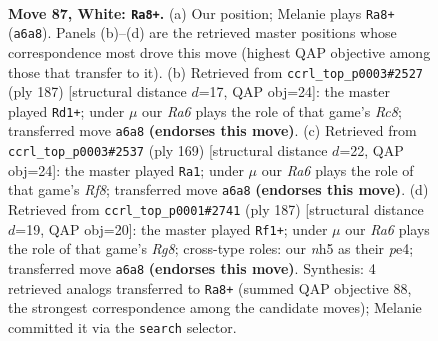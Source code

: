 \documentclass[11pt]{article}
\begin{document}
\clearpage

\begin{figure}[p]\centering
\begin{subfigure}{0.46\textwidth}\centering
\resizebox{\linewidth}{!}{%
\newchessgame
\chessboard[
  setfen={3k4/8/R7/7n/p6r/P7/7p/7K w - - 0 87},
  showmover=false,
  pgfstyle=straightmove, color=movearrow, markmove={a6-a8}
]}
\caption{}
\end{subfigure}\hfill
\begin{subfigure}{0.46\textwidth}\centering
\resizebox{\linewidth}{!}{%
\newchessgame
\chessboard[
  setfen={8/k7/P7/R1P5/3K4/8/8/2r5 b - - 28 94},
  showmover=false,
  pgfstyle=straightmove, color=movearrow, markmove={c1-d1}
]}
\caption{}
\end{subfigure}
\\[4pt]
\begin{subfigure}{0.46\textwidth}\centering
\resizebox{\linewidth}{!}{%
\newchessgame
\chessboard[
  setfen={8/7k/2R4P/4KP2/8/8/8/5r2 b - - 50 85},
  showmover=false,
  pgfstyle=straightmove, color=movearrow, markmove={f1-a1}
]}
\caption{}
\end{subfigure}\hfill
\begin{subfigure}{0.46\textwidth}\centering
\resizebox{\linewidth}{!}{%
\newchessgame
\chessboard[
  setfen={8/6k1/4R1P1/8/4PK2/8/8/6r1 b - - 64 94},
  showmover=false,
  pgfstyle=straightmove, color=movearrow, markmove={g1-f1}
]}
\caption{}
\end{subfigure}
\caption{\textbf{Move 87, White: \texttt{Ra8+}.} (a) Our position; Melanie plays \texttt{Ra8+} (\texttt{a6a8}). Panels (b)--(d) are the retrieved master positions whose correspondence most drove this move (highest QAP objective among those that transfer to it). (b) Retrieved from \texttt{ccrl\_top\_p0003\#2527} (ply 187) [structural distance $d$=17, QAP obj=24]: the master played \texttt{Rd1+}; under $\mu$ our \emph{Ra6} plays the role of that game's \emph{Rc8}; transferred move \texttt{a6a8} \textbf{(endorses this move)}. (c) Retrieved from \texttt{ccrl\_top\_p0003\#2537} (ply 169) [structural distance $d$=22, QAP obj=24]: the master played \texttt{Ra1}; under $\mu$ our \emph{Ra6} plays the role of that game's \emph{Rf8}; transferred move \texttt{a6a8} \textbf{(endorses this move)}. (d) Retrieved from \texttt{ccrl\_top\_p0001\#2741} (ply 187) [structural distance $d$=19, QAP obj=20]: the master played \texttt{Rf1+}; under $\mu$ our \emph{Ra6} plays the role of that game's \emph{Rg8}; cross-type roles: our \emph{n}h5 as their \emph{p}e4; transferred move \texttt{a6a8} \textbf{(endorses this move)}. Synthesis: 4 retrieved analogs transferred to \texttt{Ra8+} (summed QAP objective 88, the strongest correspondence among the candidate moves); Melanie committed it via the \texttt{search} selector.}
\label{fig:thought-m172}
\end{figure}
\end{document}
